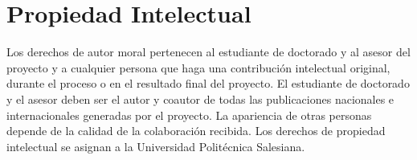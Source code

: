 \documentclass[12pt,a4paper]{article}
\begin{document}
\section{Propiedad Intelectual}
Los derechos de autor moral pertenecen al estudiante de doctorado y al asesor del proyecto y a cualquier persona que haga una contribución intelectual original, durante el proceso o en el resultado final del proyecto. El estudiante de doctorado y el asesor deben ser el autor y coautor de todas las publicaciones nacionales e internacionales generadas por el proyecto. La apariencia de otras personas depende de la calidad de la colaboración recibida. Los derechos de propiedad intelectual se asignan a la Universidad Politécnica Salesiana. 




\vfill
\end{document}
